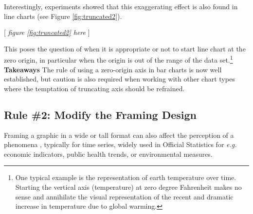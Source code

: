 \documentclass[11pt,twoside,a4paper]{article}
\begin{document}
Interestingly,  experiments \citep{Correll2019} showed that this exaggerating effect is also found in line charts (see Figure \ref{fig:truncated2}).

\begin{center}
    [ \textit{figure \ref{fig:truncated2}  here}  ]
\end{center}



 This poses the question of when it is appropriate or not to start line chart at the zero origin, in particular when the origin is out of the range of the data set.\footnote{ One typical example is the representation of earth temperature over time. Starting the vertical axis (temperature) at zero degree Fahrenheit makes no sense and annihilate the visual representation of the recent and dramatic increase in temperature due to global warming.} \\
 
\noindent \textbf{ Takeaways} The rule of using a zero-origin axis in bar charts is now well established, but caution is also required when working with other chart types where the temptation of truncating axis should be refrained. 


\subsection*{Rule \#2: Modify the Framing Design}

Framing a graphic in a wide or tall format can also affect the perception of a phenomena \citep{Pandey2015Deceptive}, typically for time series,  widely used in Official Statistics for \textit{e.g.} economic indicators, public health trends, or environmental measures.
\end{document}
